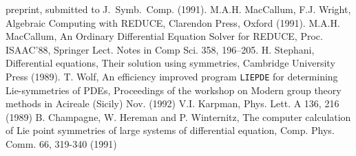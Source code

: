 \begin{thebibliography}{99}
preprint, submitted to J.\ Symb.\ Comp. (1991).
 M.A.H. MacCallum, F.J. Wright, Algebraic Computing with REDUCE,
Clarendon Press, Oxford (1991).
 M.A.H. MacCallum, An Ordinary Differential Equation
Solver for REDUCE, Proc. ISAAC'88, Springer Lect. Notes in Comp Sci.
358, 196--205.
 H. Stephani, Differential equations, Their solution using
symmetries, Cambridge University Press (1989).
 T. Wolf, An efficiency improved program {\tt LIEPDE}
for determining Lie-symmetries of PDEs, Proceedings of the workshop on
Modern group theory methods in Acireale (Sicily) Nov. (1992)
 V.I. Karpman, Phys. Lett. A 136, 216 (1989)
 B. Champagne, W. Hereman and P. Winternitz, The computer
      calculation of Lie point symmetries of large systems of differential
      equation, Comp. Phys. Comm. 66, 319-340 (1991)

\end{thebibliography}
 

